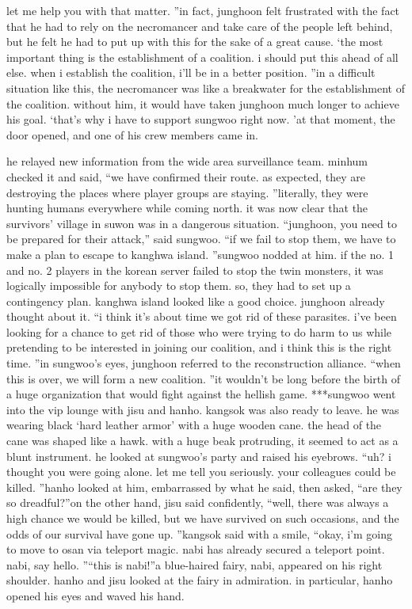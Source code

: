  let me help you with that matter.
”in fact, junghoon felt frustrated with the fact that he had to rely on the necromancer and take care of the people left behind, but he felt he had to put up with this for the sake of a great cause.
‘the most important thing is the establishment of a coalition.
 i should put this ahead of all else.
 when i establish the coalition, i’ll be in a better position.
”in a difficult situation like this, the necromancer was like a breakwater for the establishment of the coalition.
 without him, it would have taken junghoon much longer to achieve his goal.
‘that’s why i have to support sungwoo right now.
’at that moment, the door opened, and one of his crew members came in.

he relayed new information from the wide area surveillance team.
minhum checked it and said, “we have confirmed their route.
 as expected, they are destroying the places where player groups are staying.
”literally, they were hunting humans everywhere while coming north.
 it was now clear that the survivors’ village in suwon was in a dangerous situation.
“junghoon, you need to be prepared for their attack,” said sungwoo.
“if we fail to stop them, we have to make a plan to escape to kanghwa island.
”sungwoo nodded at him.
if the no.
 1 and no.
 2 players in the korean server failed to stop the twin monsters, it was logically impossible for anybody to stop them.
so, they had to set up a contingency plan.
 kanghwa island looked like a good choice.
 junghoon already thought about it.
“i think it’s about time we got rid of these parasites.
 i’ve been looking for a chance to get rid of those who were trying to do harm to us while pretending to be interested in joining our coalition, and i think this is the right time.
”in sungwoo’s eyes, junghoon referred to the reconstruction alliance.
“when this is over, we will form a new coalition.
”it wouldn’t be long before the birth of a huge organization that would fight against the hellish game.
***sungwoo went into the vip lounge with jisu and hanho.
 kangsok was also ready to leave.
he was wearing black ‘hard leather armor’ with a huge wooden cane.
 the head of the cane was shaped like a hawk.
 with a huge beak protruding, it seemed to act as a blunt instrument.
he looked at sungwoo’s party and raised his eyebrows.
“uh? i thought you were going alone.
 let me tell you seriously.
 your colleagues could be killed.
”hanho looked at him, embarrassed by what he said, then asked, “are they so dreadful?”on the other hand, jisu said confidently, “well, there was always a high chance we would be killed, but we have survived on such occasions, and the odds of our survival have gone up.
”kangsok said with a smile, “okay, i’m going to move to osan via teleport magic.
 nabi has already secured a teleport point.
 nabi, say hello.
”“this is nabi!”a blue-haired fairy, nabi, appeared on his right shoulder.
 hanho and jisu looked at the fairy in admiration.
 in particular, hanho opened his eyes and waved his hand.

